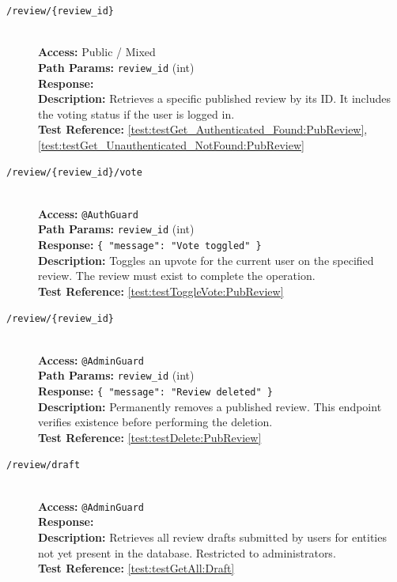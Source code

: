 \begin{description}
	\item[\GET \quad \texttt{/review/\{review\_id\}}] \hfill \\
	\textbf{Access:} Public / Mixed \\
	\textbf{Path Params:} \texttt{review\_id} (int) \\
	\textbf{Response:} \texttt{} \\
	\textbf{Description:} Retrieves a specific published review by its ID. It includes the voting status if the user is logged in.\\
	\textbf{Test Reference:} \ref{test:testGet_Authenticated_Found:PubReview}, \ref{test:testGet_Unauthenticated_NotFound:PubReview}
	
	\item[\POST \quad \texttt{/review/\{review\_id\}/vote}] \hfill \\
	\textbf{Access:} \texttt{@AuthGuard} \\
	\textbf{Path Params:} \texttt{review\_id} (int) \\
	\textbf{Response:} \texttt{\{ "message": "Vote toggled" \}} \\
	\textbf{Description:} Toggles an upvote for the current user on the specified review. The review must exist to complete the operation.\\
	\textbf{Test Reference:} \ref{test:testToggleVote:PubReview}
	
	\item[\DELETE \quad \texttt{/review/\{review\_id\}}] \hfill \\
	\textbf{Access:} \texttt{@AdminGuard} \\
	\textbf{Path Params:} \texttt{review\_id} (int) \\
	\textbf{Response:} \texttt{\{ "message": "Review deleted" \}} \\
	\textbf{Description:} Permanently removes a published review. This endpoint verifies existence before performing the deletion.\\
	\textbf{Test Reference:} \ref{test:testDelete:PubReview}
	
	\item[\GET \quad \texttt{/review/draft}] \hfill \\
	\textbf{Access:} \texttt{@AdminGuard} \\
	\textbf{Response:} \texttt{} \\
	\textbf{Description:} Retrieves all review drafts submitted by users for entities not yet present in the database. Restricted to administrators.\\
	\textbf{Test Reference:} \ref{test:testGetAll:Draft}
	

\end{description}
